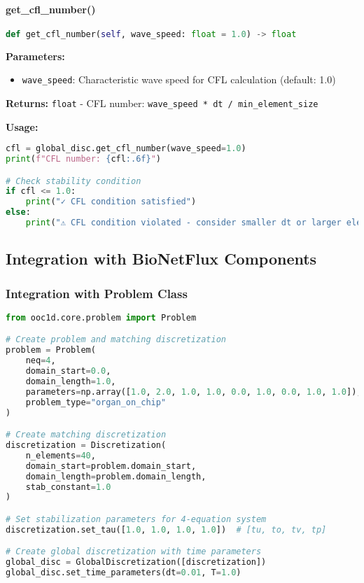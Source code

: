\paragraph{get\_cfl\_number()}
\begin{lstlisting}[language=Python, caption=Get CFL Number Method]
def get_cfl_number(self, wave_speed: float = 1.0) -> float
\end{lstlisting}

\textbf{Parameters:}
\begin{itemize}
    \item \texttt{wave\_speed}: Characteristic wave speed for CFL calculation (default: 1.0)
\end{itemize}

\textbf{Returns:} \texttt{float} - CFL number: \texttt{wave\_speed * dt / min\_element\_size}

\textbf{Usage:}
\begin{lstlisting}[language=Python, caption=CFL Number Usage]
cfl = global_disc.get_cfl_number(wave_speed=1.0)
print(f"CFL number: {cfl:.6f}")

# Check stability condition
if cfl <= 1.0:
    print("✓ CFL condition satisfied")
else:
    print("⚠ CFL condition violated - consider smaller dt or larger elements")
\end{lstlisting}

\subsection{Integration with BioNetFlux Components}
\label{subsec:discretization_integration}

\subsubsection{Integration with Problem Class}

\begin{lstlisting}[language=Python, caption=Problem-Discretization Integration]
from ooc1d.core.problem import Problem

# Create problem and matching discretization
problem = Problem(
    neq=4,
    domain_start=0.0,
    domain_length=1.0,
    parameters=np.array([1.0, 2.0, 1.0, 1.0, 0.0, 1.0, 0.0, 1.0, 1.0]),
    problem_type="organ_on_chip"
)

# Create matching discretization
discretization = Discretization(
    n_elements=40,
    domain_start=problem.domain_start,
    domain_length=problem.domain_length,
    stab_constant=1.0
)

# Set stabilization parameters for 4-equation system
discretization.set_tau([1.0, 1.0, 1.0, 1.0])  # [tu, to, tv, tp]

# Create global discretization with time parameters
global_disc = GlobalDiscretization([discretization])
global_disc.set_time_parameters(dt=0.01, T=1.0)
\end{lstlisting}


